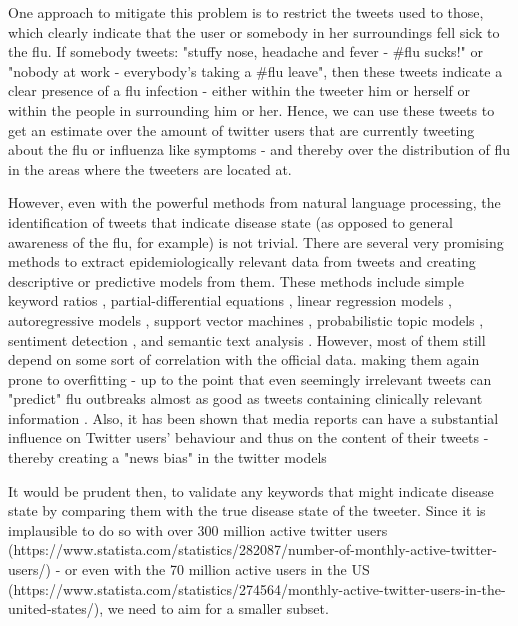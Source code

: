 \documentclass[11pt, a4paper]{report}\usepackage[]{graphicx}\usepackage[]{color}
\begin{document}
One approach to mitigate this problem is to restrict the tweets used to those, which clearly indicate that the user or somebody in her surroundings fell sick to the flu. If somebody tweets: "stuffy nose, headache and fever - \#flu sucks!" or "nobody at work - everybody's taking a \#flu leave", then these tweets indicate a clear presence of a flu infection - either within the tweeter him or herself or within the people in surrounding him or her. Hence, we can use these tweets to get an estimate over the amount of twitter users that are currently tweeting about the flu or influenza like symptoms - and thereby over the distribution of flu in the areas where the tweeters are located at.\newline

However, even with the powerful methods from natural language processing, the identification of tweets that indicate disease state (as opposed to general awareness of the flu, for example) is not trivial. There are several very promising methods to extract epidemiologically relevant data from tweets and creating descriptive or predictive models from them. These methods include simple keyword ratios \citep{lampos_tracking_2010}, partial-differential equations \citep{wang_regional_2016}, linear regression models \citep{culotta_towards_2010}, autoregressive models \citep{achrekar_predicting_2011,paul_twitter_2014,paul_worldwide_2015}, support vector machines \citep{paul_you_2011}, probabilistic topic models \citep{paul_you_2011}, sentiment detection \citep{aramaki_twitter_2011}, and semantic text analysis \citep{lamb_separating_2013}. However, most of them still depend on some sort of correlation with the official data. making them again prone to overfitting - up to the point that even seemingly irrelevant tweets can "predict" flu outbreaks almost as good as tweets containing clinically relevant information \citep{bodnar_validating_2013}. Also, it has been shown that media reports can have a substantial influence on Twitter users' behaviour and thus on the content of their tweets - thereby creating a "news bias" in the twitter models \citep{aramaki_twitter_2011}\newline

It would be prudent then, to validate any keywords that might indicate disease state by comparing them with the true disease state of the tweeter. Since it is implausible to do so with over 300 million active twitter users (https://www.statista.com/statistics/282087/number-of-monthly-active-twitter-users/) - or even with the 70 million active users in the US (https://www.statista.com/statistics/274564/monthly-active-twitter-users-in-the-united-states/), we need to aim for a smaller subset.\newline
\end{document}
